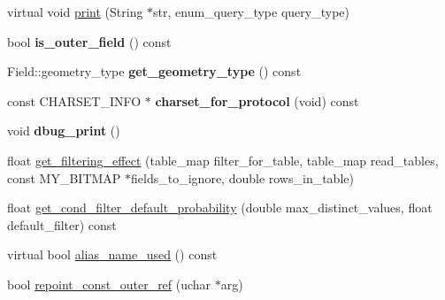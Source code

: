 \begin{DoxyCompactItemize}
\item 
virtual void \mbox{\hyperlink{classItem__field_a40b28e2bc9886f81e8ad19c64efb1408}{print}} (String $\ast$str, enum\+\_\+query\+\_\+type query\+\_\+type)
\item 
\mbox{\label{classItem__field_a33549b99388e4d2d3291afdb44732ae5}} 
bool {\bfseries is\+\_\+outer\+\_\+field} () const
\item 
\mbox{\label{classItem__field_a8e5d0dfe971030c798634bf02af23125}} 
Field\+::geometry\+\_\+type {\bfseries get\+\_\+geometry\+\_\+type} () const
\item 
\mbox{\label{classItem__field_a5a5a98fca3e69db2d3918a7629d0e2eb}} 
const C\+H\+A\+R\+S\+E\+T\+\_\+\+I\+N\+FO $\ast$ {\bfseries charset\+\_\+for\+\_\+protocol} (void) const
\item 
\mbox{\label{classItem__field_ad2d4971f7f36f7d27c308e0fc5daaf11}} 
void {\bfseries dbug\+\_\+print} ()
\item 
float \mbox{\hyperlink{classItem__field_ac11040b668deb3ccc1cd16b19bd38d03}{get\+\_\+filtering\+\_\+effect}} (table\+\_\+map filter\+\_\+for\+\_\+table, table\+\_\+map read\+\_\+tables, const M\+Y\+\_\+\+B\+I\+T\+M\+AP $\ast$fields\+\_\+to\+\_\+ignore, double rows\+\_\+in\+\_\+table)
\item 
float \mbox{\hyperlink{classItem__field_a755ca65bbe034938726acec13ea6b05a}{get\+\_\+cond\+\_\+filter\+\_\+default\+\_\+probability}} (double max\+\_\+distinct\+\_\+values, float default\+\_\+filter) const
\item 
virtual bool \mbox{\hyperlink{classItem__field_aff70313ac49d91b6b51e522b8ac4cb30}{alias\+\_\+name\+\_\+used}} () const
\item 
bool \mbox{\hyperlink{classItem__field_ac5eaad612e0fbd977769930c7c0829ae}{repoint\+\_\+const\+\_\+outer\+\_\+ref}} (uchar $\ast$arg)
\end{DoxyCompactItemize}
